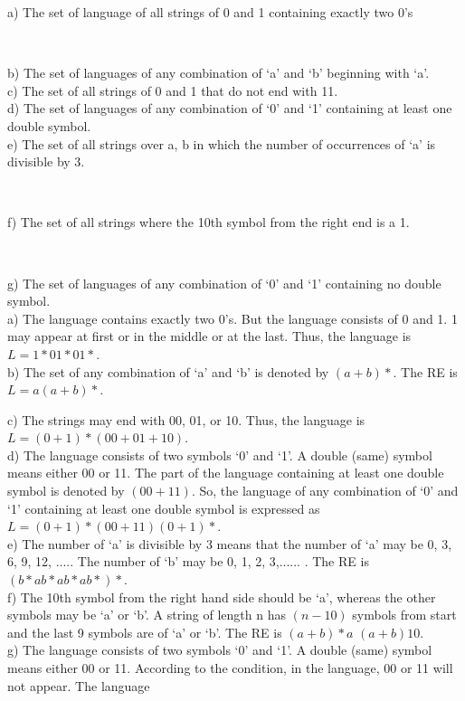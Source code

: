 \documentclass{article}
\begin{document}
a) The set of language of all strings of 0 and 1 containing exactly two 0’s\\
\begin{flushright}
   [UPTU 2004]\\
\end{flushright}
b) The set of languages of any combination of ‘a’ and ‘b’ beginning with ‘a’.\\
c) The set of all strings of 0 and 1 that do not end with 11.\\
d) The set of languages of any combination of ‘0’ and ‘1’ containing at least one double symbol.\\
e) The set of all strings over {a, b} in which the number of occurrences of ‘a’ is divisible by 3.\\
\begin{flushright}
  [UPTU 2004]\\
\end{flushright}

f) The set of all strings where the 10th symbol from the right end is a 1.\\
\begin{flushright}
   [JNTU 2007]\\
\end{flushright}
g) The set of languages of any combination of ‘0’ and ‘1’ containing no double symbol.\\
a) The language contains exactly two 0’s. But the language consists of 0 and 1. 1 may appear at
first or in the middle or at the last. Thus, the language is $L = 1*01*01*$.\\
b) The set of any combination of ‘a’ and ‘b’ is denoted by $(a+b)*$. The RE is\\

\vspace*{0.3cm}
\hspace*{4cm} $L = a(a+b)*$. \\

\vspace*{0.3cm}

c) The strings may end with 00, 01, or 10. Thus, the language is $L = (0+1)*(00 + 01+10)$.\\
d) The language consists of two symbols ‘0’ and ‘1’. A double (same) symbol means either 00
or 11. The part of the language containing at least one double symbol is denoted by $(00 + 11)$.
So, the language of any combination of ‘0’ and ‘1’ containing at least one double symbol is
expressed as $L = (0+1)* (00+11) (0+1)*$.\\
e) The number of ‘a’ is divisible by 3 means that the number of ‘a’ may be 0, 3, 6, 9, 12, .....
The number of ‘b’ may be 0, 1, 2, 3,...... . The RE is $(b*ab*ab*ab*)*$.\\
f) The 10th symbol from the right hand side should be ‘a’, whereas the other symbols may be ‘a’
or ‘b’. A string of length n has $(n-10)$ symbols from start and the last 9 symbols are of ‘a’ or
‘b’. The RE is $(a + b)*a$ $(a + b)10$.\\
g) The language consists of two symbols ‘0’ and ‘1’. A double (same) symbol means either 00
or 11. According to the condition, in the language, 00 or 11 will not appear. The language\\
\end{document}
